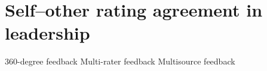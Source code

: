 

\section{Self–other rating agreement in leadership}
360-degree feedback
Multi-rater feedback
Multisource feedback